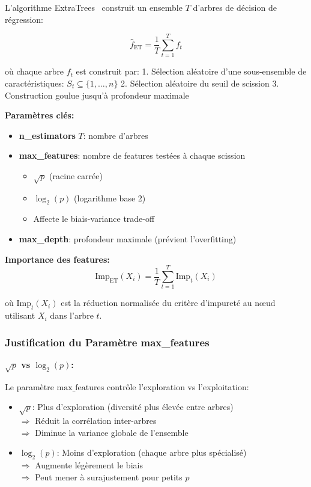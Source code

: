 \documentclass[12pt,a4paper,french]{article}
\begin{document}
L'algorithme ExtraTrees~\cite{geurts2006} construit un ensemble $T$ d'arbres de décision de régression:

\begin{equation}
\hat{f}_{\text{ET}} = \frac{1}{T} \sum_{t=1}^T f_t
\end{equation}

où chaque arbre $f_t$ est construit par:
1. Sélection aléatoire d'une sous-ensemble de caractéristiques: $S_t \subseteq \{1, \ldots, n\}$
2. Sélection aléatoire du seuil de scission
3. Construction goulue jusqu'à profondeur maximale

\textbf{Paramètres clés:}
\begin{itemize}
    \item \textbf{n\_estimators} $T$: nombre d'arbres
    \item \textbf{max\_features}: nombre de features testées à chaque scission
        \begin{itemize}
            \item $\sqrt{p}$ (racine carrée)
            \item $\log_2(p)$ (logarithme base 2)
            \item Affecte le biais-variance trade-off
        \end{itemize}
    \item \textbf{max\_depth}: profondeur maximale (prévient l'overfitting)
\end{itemize}

\textbf{Importance des features:}
\begin{equation}
\text{Imp}_{\text{ET}}(X_i) = \frac{1}{T} \sum_{t=1}^T \text{Imp}_t(X_i)
\end{equation}

où $\text{Imp}_t(X_i)$ est la réduction normalisée du critère d'impureté au nœud utilisant $X_i$ dans l'arbre $t$.

\subsubsection{Justification du Paramètre max\_features}

\textbf{$\sqrt{p}$ vs $\log_2(p)$:}

Le paramètre $\text{max\_features}$ contrôle l'exploration vs l'exploitation:
\begin{itemize}
    \item \textbf{$\sqrt{p}$}: Plus d'exploration (diversité plus élevée entre arbres)
        \\ $\Rightarrow$ Réduit la corrélation inter-arbres
        \\ $\Rightarrow$ Diminue la variance globale de l'ensemble
    
    \item \textbf{$\log_2(p)$}: Moins d'exploration (chaque arbre plus spécialisé)
        \\ $\Rightarrow$ Augmente légèrement le biais
        \\ $\Rightarrow$ Peut mener à surajustement pour petits $p$
\end{itemize}
\end{document}
